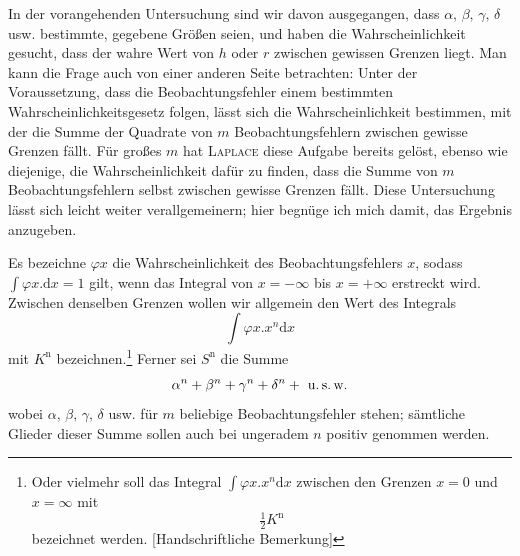 In der vorangehenden Untersuchung sind wir davon ausgegangen, dass \(\alpha,\,\beta,\,\gamma,\,\delta\) usw. bestimmte, gegebene Größen seien, und haben die Wahrscheinlichkeit gesucht, dass der wahre Wert von \(h\) oder \(r\) zwischen gewissen Grenzen liegt. Man kann die Frage auch von einer anderen Seite betrachten: Unter der Voraussetzung, dass die Beobachtungsfehler einem bestimmten Wahrscheinlichkeitsgesetz folgen, lässt sich die Wahrscheinlichkeit bestimmen, mit der die Summe der Quadrate von \(m\) Beobachtungsfehlern zwischen gewisse Grenzen fällt. Für großes \(m\) hat \textsc{Laplace} diese Aufgabe bereits gelöst, ebenso wie diejenige, die Wahrscheinlichkeit dafür zu finden, dass die Summe von \(m\) Beobachtungsfehlern selbst zwischen gewisse Grenzen fällt. Diese Untersuchung lässt sich leicht weiter verallgemeinern; hier begnüge ich mich damit, das Ergebnis anzugeben.

Es bezeichne \(\varphi x\) die Wahrscheinlichkeit des Beobachtungsfehlers \(x\), sodass \(\int\varphi x.\mathrm{d}x=1\) gilt, wenn das Integral von \(x=-\infty\) bis \(x=+\infty\) erstreckt wird. Zwischen denselben Grenzen wollen wir allgemein den Wert des Integrals
\[
\int\varphi x.x^n\mathrm{d}x
\]
mit \(K^{\mathrm n}\) bezeichnen.\footnote{Oder vielmehr soll das Integral \(\int\varphi x.x^n\mathrm{d}x\) zwischen den Grenzen \(x=0\) und \(x=\infty\) mit
\[\tfrac12K^{\mathrm n}\]
bezeichnet werden. [Handschriftliche Bemerkung]} Ferner sei \(S^{\mathrm n}\) die Summe
\[
\alpha^n+\beta^n+\gamma^n+\delta^n+\text{ u.\,s.\,w.}
\]
wobei \(\alpha,\,\beta,\,\gamma,\,\delta\) usw. für \(m\) beliebige Beobachtungsfehler stehen; sämtliche Glieder dieser Summe sollen auch bei ungeradem \(n\) positiv genommen werden.

